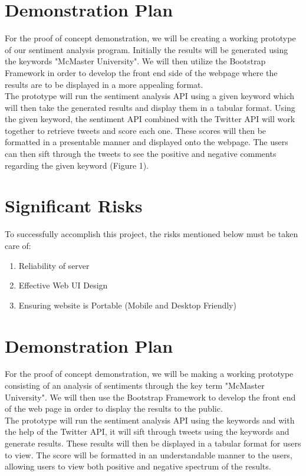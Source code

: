 \documentclass{article}
\begin{document}
\section{Demonstration Plan}
For the proof of concept demonstration, we will be creating a working prototype of our sentiment analysis program. Initially the results will be generated using the keywords "McMaster University". We will then utilize the Bootstrap Framework in order to develop the front end side of the webpage where the results are to be displayed in a more appealing format. \\

The prototype will run the sentiment analysis API using a given keyword which will then take the generated results and display them in a tabular format. Using the given keyword, the sentiment API combined with the Twitter API will work together to retrieve tweets and score each one. These scores will then be formatted in a presentable manner and displayed onto the webpage. The users can then sift through the tweets to see the positive and negative comments regarding the given keyword (Figure 1). 

\section{Significant Risks}
To successfully accomplish this project, the risks mentioned below must be taken care of:
\begin{enumerate}
	\item Reliability of server
	\item Effective Web UI Design
	\item Ensuring website is Portable (Mobile and Desktop Friendly)
\end{enumerate}



\section{Demonstration Plan}
For the proof of concept demonstration, we will be making a working prototype consisting of an analysis of sentiments through the key term "McMaster University". We will then use the Bootstrap Framework to develop the front end of the web page in order to display the results to the public.\\

The prototype will run the sentiment analysis API using the keywords and with the help of the Twitter API, it will sift through tweets using the keywords and generate results. These results will then be displayed in a tabular format for users to view. The score will be formatted in an understandable manner to the users, allowing users to view both positive and negative spectrum of the results.
	
\end{document}
